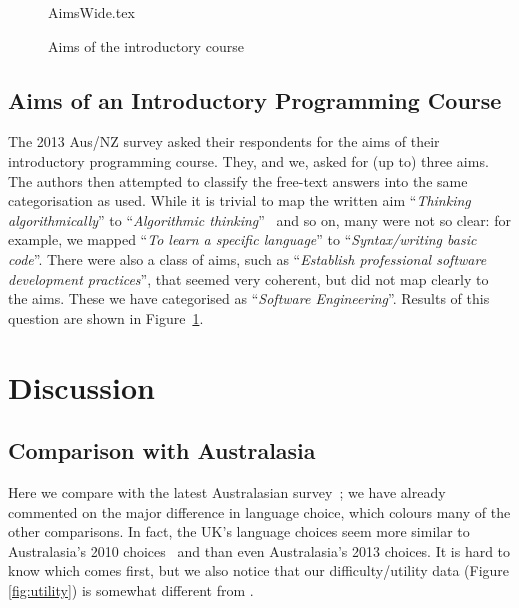 \documentclass[english,submission]{programming}
\begin{document}

\begin{figure}
\begin{center}
{AimsWide.tex}
\end{center}
\caption{Aims of the introductory course\label{fig:aims}}
\end{figure}

\subsection{Aims of an Introductory Programming Course}

The 2013 Aus/NZ survey asked their respondents for the aims of their
introductory programming course. They, and we, asked for (up to) three
aims. The authors then attempted to classify the free-text answers
into the same categorisation as \cite{mason+cooper:2014} used. While
it is trivial to map the written aim ``{\emph{Thinking
algorithmically}}'' to ``{\emph{Algorithmic
thinking}}''~\cite{mason+cooper:2014} and so on, many were not so
clear: for example, we mapped ``{\emph{To learn a specific
language}}'' to ``{\emph{Syntax/writing basic code}}''. There were
also a class of aims, such as ``{\emph{Establish professional software
development practices}}'', that seemed very coherent, but did not map
clearly to the \cite{mason+cooper:2014} aims. These we have
categorised as ``{\emph{Software Engineering}}''. Results of this
question are shown in Figure~\ref{fig:aims}.


\section{Discussion}\label{discussion}

\subsection{Comparison with Australasia}

Here we compare with the latest Australasian
survey~\cite{mason+cooper:2014}; we have already commented on the
major difference in language choice, which colours many of the other
comparisons. In fact, the UK's language choices seem more similar to
Australasia's 2010 choices~\cite{mason-et-al:2012} and \cite[Table
4]{mason+cooper:2014} than even Australasia's 2013 choices. It is hard
to know which comes first, but we also notice that our
difficulty/utility data (Figure \ref{fig:utility}) is somewhat
different from \cite[Figures 7/8]{mason+cooper:2014}.
\end{document}
